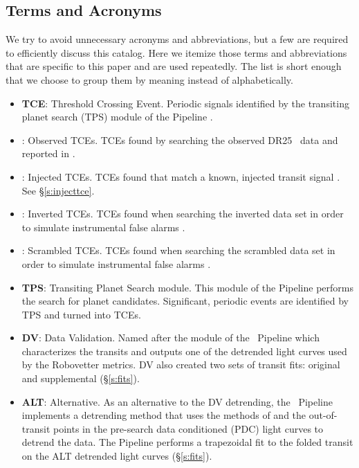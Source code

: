 \subsection{Terms and Acronyms}
\label{abbrev}
We try to avoid unnecessary acronyms and abbreviations, but a few are required to efficiently discuss this catalog.  Here we itemize those terms and abbreviations that are specific to this paper and are used repeatedly. The list is short enough that we choose to group them by meaning instead of alphabetically. 

\begin{itemize}

\item[] \textbf{TCE}: Threshold Crossing Event. Periodic signals identified by the transiting planet search (TPS) module of the \Kepler{} Pipeline \citep{JenkinsKDPH}.
\item[] \textbf{\opstce}: Observed TCEs. TCEs found by searching the observed DR25 \Kepler\ data and reported in \citet{Twicken2016}. 
\item[] \textbf{\injtce}: Injected TCEs. TCEs found that match a known, injected transit signal \citep{Christiansen2017}. See \S\ref{s:injecttce}.
\item[] \textbf{\invtce}: Inverted TCEs. TCEs found when searching the inverted data set in order to simulate instrumental false alarms \citep{Coughlin2017a}. 
\item[] \textbf{\scrtce}: Scrambled TCEs. TCEs found when searching the scrambled data set in order to simulate instrumental false alarms \citep{Coughlin2017a}. 
\item[] \textbf{TPS}: Transiting Planet Search module. This module of the \Kepler{} Pipeline performs the search for planet candidates. Significant, periodic events are identified by TPS and turned into TCEs.
\item[] \textbf{DV}: Data Validation. Named after the module of the \Kepler\ Pipeline \citep{JenkinsKDPH} which characterizes the transits and outputs one of the detrended light curves used by the Robovetter metrics.  DV also created two sets of transit fits: original and supplemental (\S\ref{s:fits}).
\item[] \textbf{ALT}: Alternative. As an alternative to the DV detrending, the \Kepler\ Pipeline implements a detrending method that uses the methods of \citet{Garcia2010} and the out-of-transit points in the pre-search data conditioned (PDC) light curves to detrend the data. The \Kepler{} Pipeline performs a trapezoidal fit to the folded transit on the ALT detrended light curves (\S\ref{s:fits}).

\end{itemize}

